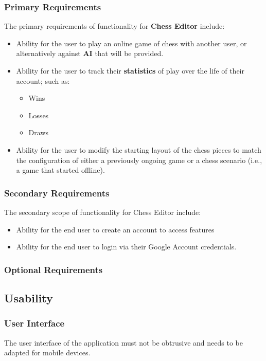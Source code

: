 \documentclass[11pt]{article}
\begin{document}
\subsubsection{Primary Requirements}
\label{sec:org2d3794d}
The primary requirements of functionality for \textbf{Chess Editor}  include:
\begin{itemize}
\item Ability for the user to play an online game of chess with
another user, or alternatively against \textbf{AI} that will be
provided.
\item Ability for the user to track their \textbf{statistics} of play over
the life of their account; such as:
\begin{itemize}
\item Wins
\item Losses
\item Draws
\end{itemize}
\item Ability for the user to modify the starting layout of the chess
pieces to match the configuration of either a previously ongoing
game or a chess scenario (i.e., a game that started offline).
\end{itemize}
\subsubsection{Secondary Requirements}
\label{sec:orgcf22781}
The secondary scope of functionality for Chess Editor include:
\begin{itemize}
\item Ability for the end user to create an account to access features
\item Ability for the end user to login via their Google Account credentials.
\end{itemize}
\subsubsection{Optional Requirements}
\label{sec:orgf35dc23}
\subsection{Usability}
\label{sec:org9d7b336}
\subsubsection{User Interface}
\label{sec:orgf92c9f9}
The user interface of the application must not be obtrusive and
needs to be adapted for mobile devices.
\end{document}
